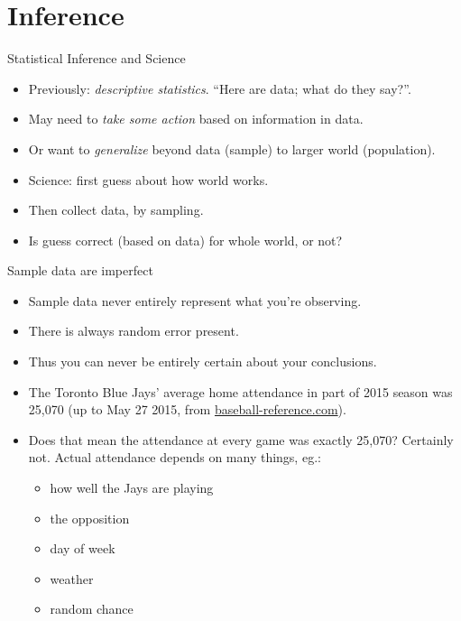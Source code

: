 \documentclass[unknownkeysallowed]{beamer}\usepackage[]{graphicx}\usepackage[]{color}
\begin{document}


\section{Inference}

\frame{\sectionpage}


\begin{frame}{Statistical Inference and Science}



\begin{itemize}
\item Previously: \emph{descriptive statistics}. ``Here are data; what
  do they say?''.
\item May need to \emph{take some action} based on information in data.
\item Or want to \emph{generalize} beyond data (sample) to larger
  world (population).
\item Science: first guess about how world works.
\item Then collect data, by sampling.
\item Is guess correct (based on data) for whole world, or not?
\end{itemize}

\end{frame}

\begin{frame}[fragile]{Sample data are imperfect}
  
  \begin{itemize}
  \item Sample data never entirely represent what you're observing.
  \item There is always random error present.
  \item Thus you can never be entirely certain about your conclusions.
  \item The Toronto Blue Jays' average home attendance in part of 2015
    season was 25,070
    (up to May 27 2015, from \url{baseball-reference.com}).
  \item Does that mean the attendance at every game was exactly
    25,070? Certainly not. Actual attendance depends on many things, eg.:
    \begin{itemize}
    \item how well the Jays are playing
    \item the opposition
    \item day of week
    \item weather
    \item random chance
    \end{itemize}
  \end{itemize}
  
\end{frame}
\end{document}
